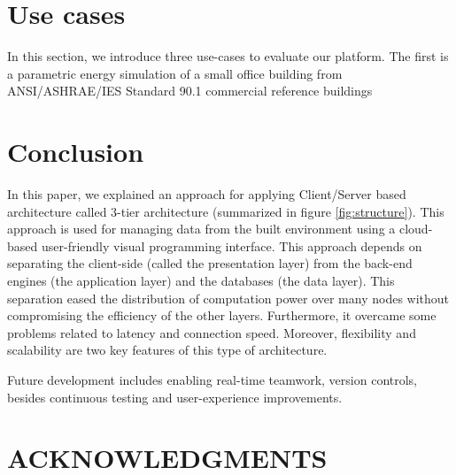 \documentclass{scsSimAUDPaperFormat}
\begin{document}
\section{Use cases} \label{section:casestudy}
In this section, we introduce three use-cases to evaluate our platform. The first is a parametric energy simulation of a small office building from ANSI/ASHRAE/IES Standard 90.1 commercial reference buildings

\section{Conclusion}
In this paper, we explained an approach for applying Client/Server based architecture called 3-tier architecture (summarized in figure \ref{fig:structure}). This approach is used for managing data from the built environment using a cloud-based user-friendly visual programming interface. This approach depends on separating the client-side (called the presentation layer) from the back-end engines (the application layer) and the databases (the data layer). This separation eased the distribution of computation power over many nodes without compromising the efficiency of the other layers. Furthermore, it overcame some problems related to latency and connection speed. Moreover, flexibility and scalability are two key features of this type of architecture. 

Future development includes enabling real-time teamwork, version controls, besides continuous testing and user-experience improvements. 

\section*{ACKNOWLEDGMENTS}
\clearpage
\balance






\end{document}
